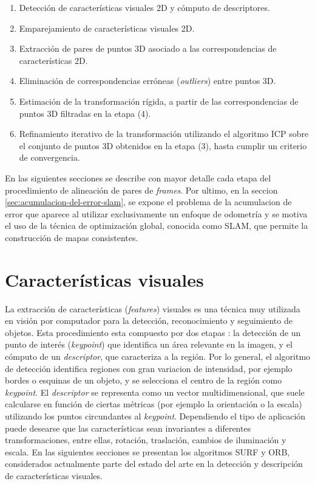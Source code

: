\begin{enumerate}
\item Detección de características visuales 2D y cómputo de descriptores.

\item Emparejamiento de características visuales 2D.

\item Extracción de pares de puntos 3D asociado a las correspondencias de características 2D.

\item Eliminación de correspondencias erróneas (\textit{outliers}) entre puntos 3D.

\item Estimación de la transformación rígida, a partir de las correspondencias de puntos 3D filtradas en la etapa (4).

\item Refinamiento iterativo de la transformación utilizando el algoritmo ICP sobre el conjunto de puntos 3D obtenidos en la etapa (3), hasta cumplir un criterio de convergencia.
\end{enumerate}

En las siguientes secciones se describe con mayor detalle cada etapa del procedimiento de alineación de pares de \textit{frames}. Por ultimo, en la seccion \ref{sec:acumulacion-del-error-slam}, se expone el problema de la acumulacion de error que aparece al utilizar exclusivamente un enfoque de odometría y se motiva el uso de la técnica de optimización global, conocida como SLAM, que permite la construcción de mapas consistentes.

\section{Características visuales}
\label{sec:features}

La extracción de características (\textit{features}) visuales es una técnica muy utilizada en visión por computador para la detección, reconocimiento y seguimiento de objetos. Esta procedimiento esta compuesto por dos etapas : la detección de un punto de interés (\textit{keypoint}) que identifica un área relevante en la imagen, y el cómputo de un \textit{descriptor}, que caracteriza a la región. Por lo general, el algoritmo de detección identifica regiones con gran variacion de intensidad, por ejemplo bordes o esquinas de un objeto, y se selecciona el centro de la región como \textit{keypoint}. El \textit{descriptor} se representa como un vector multidimensional, que suele calcularse en función de ciertas métricas (por ejemplo la orientación o la escala) utilizando los puntos circundantes al \textit{keypoint}. Dependiendo el tipo de aplicación puede desearse que las características sean invariantes a diferentes transformaciones, entre ellas, rotación, traslación, cambios de iluminación y escala. En las siguientes secciones se presentan los algoritmos SURF y ORB, considerados actualmente parte del estado del arte en la detección y descripción de características visuales.

